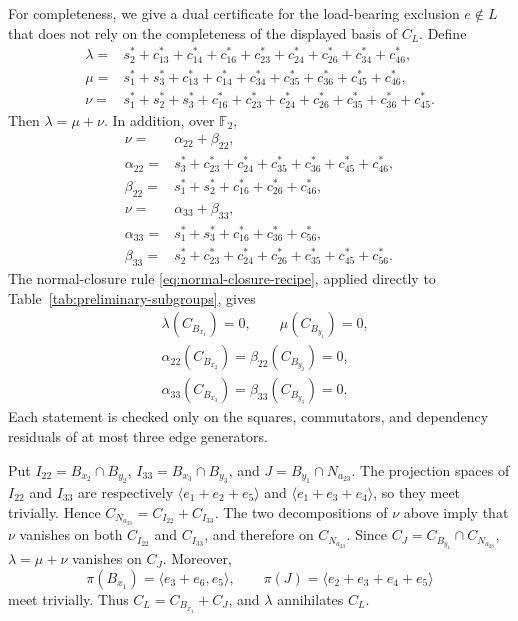 \documentclass[journal]{IEEEtran}
\newcommand{\Ftwo}{\mathbb F_2}
\begin{document}
For completeness, we give a dual certificate for the load-bearing exclusion
$e\notin L$ that does not rely on the completeness of the displayed basis of
$C_L$.  Define
\begin{align*}
\lambda={}&s_2^*+c_{13}^*+c_{14}^*+c_{16}^*+c_{23}^*+c_{24}^*
          +c_{26}^*+c_{34}^*+c_{46}^*,\\
\mu={}&s_1^*+s_3^*+c_{13}^*+c_{14}^*+c_{34}^*+c_{35}^*
        +c_{36}^*+c_{45}^*+c_{46}^*,\\
\nu={}&s_1^*+s_2^*+s_3^*+c_{16}^*+c_{23}^*+c_{24}^*+c_{26}^*
        +c_{35}^*+c_{36}^*+c_{45}^*.
\end{align*}
Then $\lambda=\mu+\nu$.  In addition, over $\Ftwo$,
\begin{align*}
\nu={}&\alpha_{22}+\beta_{22},\\
\alpha_{22}={}&s_3^*+c_{23}^*+c_{24}^*+c_{35}^*+c_{36}^*+c_{45}^*+c_{46}^*,\\
\beta_{22}={}&s_1^*+s_2^*+c_{16}^*+c_{26}^*+c_{46}^*,\\[1mm]
\nu={}&\alpha_{33}+\beta_{33},\\
\alpha_{33}={}&s_1^*+s_3^*+c_{16}^*+c_{36}^*+c_{56}^*,\\
\beta_{33}={}&s_2^*+c_{23}^*+c_{24}^*+c_{26}^*+c_{35}^*+c_{45}^*+c_{56}^*.
\end{align*}
The normal-closure rule \eqref{eq:normal-closure-recipe}, applied directly to
Table~\ref{tab:preliminary-subgroups}, gives
\begin{align*}
&\lambda(C_{B_{x_1}})=0,\qquad \mu(C_{B_{y_1}})=0,\\
&\alpha_{22}(C_{B_{x_2}})=\beta_{22}(C_{B_{y_2}})=0,\\
&\alpha_{33}(C_{B_{x_3}})=\beta_{33}(C_{B_{y_3}})=0.
\end{align*}
Each statement is checked only on the squares, commutators, and dependency
residuals of at most three edge generators.

Put
$I_{22}=B_{x_2}\cap B_{y_2}$,
$I_{33}=B_{x_3}\cap B_{y_3}$, and
$J=B_{y_1}\cap N_{a_{23}}$.  The projection spaces of $I_{22}$ and $I_{33}$
are respectively
$\langle e_1+e_2+e_5\rangle$ and
$\langle e_1+e_3+e_4\rangle$, so they meet trivially.  Hence
$C_{N_{a_{23}}}=C_{I_{22}}+C_{I_{33}}$.  The two decompositions of $\nu$
above imply that $\nu$ vanishes on both $C_{I_{22}}$ and $C_{I_{33}}$, and
therefore on $C_{N_{a_{23}}}$.  Since $C_J=C_{B_{y_1}}\cap C_{N_{a_{23}}}$,
$\lambda=\mu+\nu$ vanishes on $C_J$.
Moreover,
\[
 \pi(B_{x_1})=\langle e_3+e_6,e_5\rangle,
 \qquad
 \pi(J)=\langle e_2+e_3+e_4+e_5\rangle
\]
meet trivially.  Thus
$C_L=C_{B_{x_1}}+C_J$, and $\lambda$ annihilates $C_L$.
\end{document}
